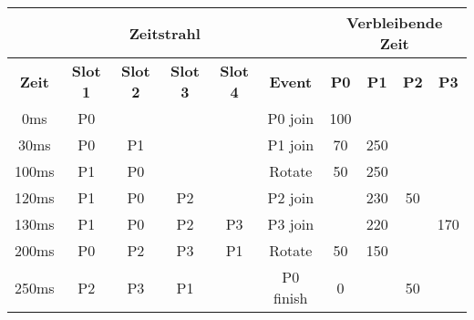 \begin{frame}
    \begin{table}[]
        \begin{adjustbox}{width=0.8\textwidth}
            \begin{tabular}{c|cccc|c|cccc}
                \multicolumn{6}{c}{\textbf{Zeitstrahl}} & \multicolumn{4}{|c}{Verbleibende Zeit}                                                                                                                                \\ \hline
                \textbf{Zeit}                           & \textbf{Slot 1}                        & \textbf{Slot 2} & \textbf{Slot 3} & \textbf{Slot 4} & \textbf{Event} & \textbf{P0} & \textbf{P1} & \textbf{P2} & \textbf{P3} \\ \hline
                0ms                                     & \alert{P0}                             &                 &                 &                 & P0 join        & \alert{100} &             &             &             \\
                \pause 30ms                             & P0                                     & \alert{P1}      &                 &                 & P1 join        & \alert{70}  & 250         &             &             \\
                \pause 100ms                            & \alert{P1}                             & \alert{P0}      &                 &                 & \alert{Rotate} & \alert{50}  & 250         &             &             \\
                \pause 120ms                            & P1                                     & P0              & \alert{P2}      &                 & P2 join        &             & \alert{230} & 50          &             \\
                \pause 130ms                            & P1                                     & P0              & P2              & \alert{P3}      & P3 join        &             & \alert{220} &             & 170         \\
                \pause 200ms                            & \alert{P0}                             & \alert{P2}      & \alert{P3}      & \alert{P1}      & \alert{Rotate} & 50          & \alert{150} &             &             \\
                \pause 250ms                            & P2                                     & P3              & P1              &                 & P0 finish      & \alert{0}   &             & 50          &             \\

\end{tabular}
\end{adjustbox}
\end{table}
\end{frame}
